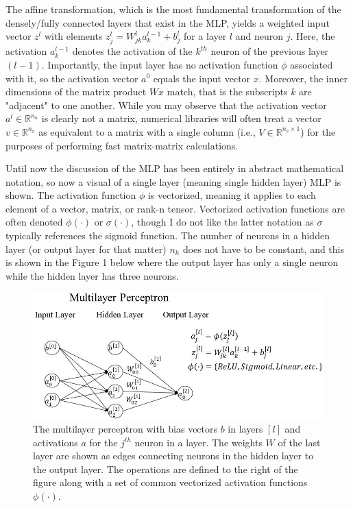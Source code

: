 \documentclass{article}
\begin{document}
The affine transformation, which is the most fundamental transformation
of the densely/fully connected layers that exist in the MLP, yields
a weighted input vector $z^{l}$ with elements
$z_j^{l} = W_{jk}^{l} a_{k}^{l-1} + b_{j}^{l}$ for a layer $l$ and neuron $j$.
Here, the activation $a_k^{l-1}$ denotes the activation of the $k^{th}$ neuron of the
previous layer $(l-1)$. Importantly, the input layer has no activation function $\phi$
associated with it, so the activation vector $a^{0}$ equals the input vector $x$.
Moreover, the inner dimensions of the matrix product
$Wx$ match, that is the subscripts $k$ are "adjacent" to one another. While you may
observe that the activation vector $a^{l} \in \mathbb{R}^{n_a}$ is clearly not a matrix,
numerical libraries will often treat a vector $v \in \mathbb{R}^{n_v}$ as equivalent
to a matrix with a single column (i.e., $V \in \mathbb{R}^{n_v \times 1}$) for
the purposes of performing fast matrix-matrix calculations.

Until now the discussion of the MLP has been entirely in abstract mathematical
notation, so now a visual of a single layer (meaning single hidden layer)
MLP is shown. The activation function $\phi$ is vectorized, meaning it
applies to each element of a vector, matrix, or rank-n tensor. Vectorized
activation functions are often denoted $\phi(\cdot)$ or $\sigma(\cdot)$, though I do not like
the latter notation as $\sigma$ typically references the sigmoid function. The number of
neurons in a hidden layer (or output layer for that matter) $n_h$ does not have
to be constant, and this is shown in the Figure 1 below where the output layer
has only a single neuron while the hidden layer has three neurons.

\begin{figure}[h]
	\includegraphics[scale=0.60]{mlp_larger_font_croppped.jpg}
	\caption{The multilayer perceptron with bias vectors $b$ in layers
		$[l]$ and activations $a$ for the $j^{th}$ neuron in a layer. The weights
		$W$ of the last layer are shown as edges connecting neurons in the hidden
		layer to the output layer. The operations are defined to the right
		of the figure along with a set of
		common vectorized activation functions $\phi(\cdot)$.}
\end{figure}
\end{document}
